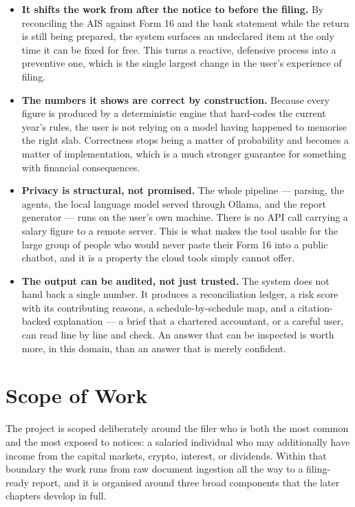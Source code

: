 \documentclass[12pt, a4paper, oneside]{report}
\begin{document}
\begin{itemize}
    \item \textbf{It shifts the work from after the notice to before the
          filing.} By reconciling the AIS against Form 16 and the bank statement
          while the return is still being prepared, the system surfaces an
          undeclared item at the only time it can be fixed for free. This turns
          a reactive, defensive process into a preventive one, which is the
          single largest change in the user's experience of filing.
    \item \textbf{The numbers it shows are correct by construction.} Because
          every figure is produced by a deterministic engine that hard-codes the
          current year's rules, the user is not relying on a model having
          happened to memorise the right slab. Correctness stops being a matter
          of probability and becomes a matter of implementation, which is a much
          stronger guarantee for something with financial consequences.
    \item \textbf{Privacy is structural, not promised.} The whole pipeline ---
          parsing, the agents, the local language model served through Ollama,
          and the report generator --- runs on the user's own machine. There is
          no API call carrying a salary figure to a remote server. This is what
          makes the tool usable for the large group of people who would never
          paste their Form 16 into a public chatbot, and it is a property the
          cloud tools simply cannot offer.
    \item \textbf{The output can be audited, not just trusted.} The system does
          not hand back a single number. It produces a reconciliation ledger, a
          risk score with its contributing reasons, a schedule-by-schedule map,
          and a citation-backed explanation --- a brief that a chartered
          accountant, or a careful user, can read line by line and check. An
          answer that can be inspected is worth more, in this domain, than an
          answer that is merely confident.
\end{itemize}

\section{Scope of Work}
\label{sec:scope}

The project is scoped deliberately around the filer who is both the most common
and the most exposed to notices: a salaried individual who may additionally have
income from the capital markets, crypto, interest, or dividends. Within that
boundary the work runs from raw document ingestion all the way to a
filing-ready report, and it is organised around three broad components that the
later chapters develop in full.
\end{document}
